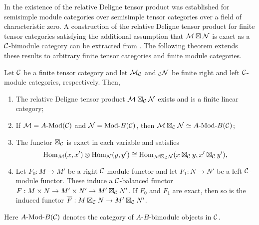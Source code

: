 \documentclass{amsart}
\begin{document}
In \cite{0909.3140} the existence of the relative Deligne tensor product was established for semisimple module categories over semisimple tensor categories over a field of characteristic zero.  A construction of the relative Deligne tensor product for finite tensor categories satisfying the additional assumption that $\mathcal M \boxtimes \mathcal N$ is exact as a $\mathcal C$-bimodule category can be extracted from \cite[Thm 3.1]{1102.3411}. The following theorem extends these results to arbitrary finite tensor categories and finite module categories. 

\begin{theorem} \label{thm:DelignePrdtOverATCExists}
	Let $\mathcal C$ be a finite tensor category and let $\mathcal M_{\mathcal C}$ and ${}_{\mathcal C}\mathcal N$ be finite right and left $\mathcal C$-module categories, respectively. Then,
	\begin{enumerate}
		\item The relative Deligne tensor product $\mathcal M \boxtimes_{\mathcal C} \mathcal N$ exists and is a finite linear category;
		\item If $\cM = \Mod{A}{}(\cC)$ and $\cN = \Mod{}{B}(\cC)$, then $\cM \boxtimes_{\cC} \cN \simeq \Mod{A }{B}(\cC)$;

		\item The functor $\boxtimes_{\mathcal C}$ is exact in each variable and satisfies 
		\begin{equation*}
			\operatorname{Hom}_{\mathcal M}(x,x') \otimes \operatorname{Hom}_{\mathcal N}(y, y') \cong \operatorname{Hom}_{\mathcal M \boxtimes_{\mathcal C} \mathcal N} (x \boxtimes_{\mathcal C} y, x' \boxtimes_{\mathcal C} y'),
		\end{equation*}
		\item Let $F_0: M \to M'$ be a right $\mathcal C$-module functor and let $F_1: N \to N'$ be a left $\mathcal C$-module functor. These induce a $\mathcal C$-balanced functor $F: M \times N \to M' \times N' \to M' \boxtimes_{\mathcal C} N'$. If $F_0$ and $F_1$ are exact, then so is the induced functor $\overline{F}: M \boxtimes_{\mathcal C} N \to M' \boxtimes_{\mathcal C} N'$.
	\end{enumerate} 
\nid Here $\Mod{A}{B}(\cC)$ denotes the category of $A$-$B$-bimodule objects in $\mathcal C$.
\end{theorem}


\end{document}
